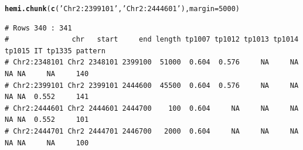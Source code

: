 \documentclass{article}\usepackage[]{graphicx}\usepackage[]{color}
\makeatletter
\newcommand{\hlnum}[1]{\textcolor[rgb]{0.686,0.059,0.569}{#1}}%
\newcommand{\hlstr}[1]{\textcolor[rgb]{0.192,0.494,0.8}{#1}}%
\newcommand{\hlstd}[1]{\textcolor[rgb]{0.345,0.345,0.345}{#1}}%
\newcommand{\hlkwc}[1]{\textcolor[rgb]{0.333,0.667,0.333}{#1}}%
\newcommand{\hlkwd}[1]{\textcolor[rgb]{0.737,0.353,0.396}{\textbf{#1}}}%
\newenvironment{kframe}{%
 \def\at@end@of@kframe{}%
 \ifinner\ifhmode%
  \def\at@end@of@kframe{\end{minipage}}%
  \begin{minipage}{\columnwidth}%
 \fi\fi%
 \def\FrameCommand##1{\hskip\@totalleftmargin \hskip-\fboxsep
 \colorbox{shadecolor}{##1}\hskip-\fboxsep
     \hskip-\linewidth \hskip-\@totalleftmargin \hskip\columnwidth}%
 \MakeFramed {\advance\hsize-\width
   \@totalleftmargin\z@ \linewidth\hsize
   \@setminipage}}%
 {\par\unskip\endMakeFramed%
 \at@end@of@kframe}
\newenvironment{knitrout}{}{} %
\makeatother
\begin{document}
\begin{knitrout}\footnotesize
{}\color{fgcolor}\begin{kframe}
\begin{alltt}
\hlkwd{hemi.chunk}\hlstd{(}\hlkwd{c}\hlstd{(}\hlstr{'Chr2:2399101'}\hlstd{,}\hlstr{'Chr2:2444601'}\hlstd{),}\hlkwc{margin}\hlstd{=}\hlnum{5000}\hlstd{)}
\end{alltt}
\begin{verbatim}
# Rows 340 : 341 
#               chr   start     end length tp1007 tp1012 tp1013 tp1014 tp1015 IT tp1335 pattern
# Chr2:2348101 Chr2 2348101 2399100  51000  0.604  0.576     NA     NA     NA NA     NA     140
# Chr2:2399101 Chr2 2399101 2444600  45500  0.604  0.576     NA     NA     NA NA  0.552     141
# Chr2:2444601 Chr2 2444601 2444700    100  0.604     NA     NA     NA     NA NA  0.552     101
# Chr2:2444701 Chr2 2444701 2446700   2000  0.604     NA     NA     NA     NA NA     NA     100
\end{verbatim}
\end{kframe}


\end{knitrout}
\end{document}
